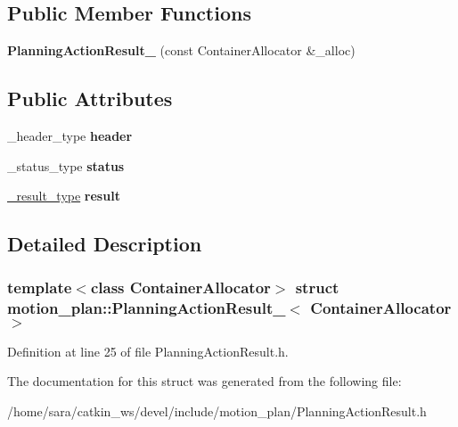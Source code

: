 \subsection*{Public Member Functions}
\begin{DoxyCompactItemize}
\item 
\mbox{\label{structmotion__plan_1_1PlanningActionResult___a4e03e3c0029195103b4500dd6cfce420}} 
{\bfseries Planning\+Action\+Result\+\_\+} (const Container\+Allocator \&\+\_\+alloc)
\end{DoxyCompactItemize}
\subsection*{Public Attributes}
\begin{DoxyCompactItemize}
\item 
\mbox{\label{structmotion__plan_1_1PlanningActionResult___ad28395876223b080fb23e7bd5564e360}} 
\+\_\+header\+\_\+type {\bfseries header}
\item 
\mbox{\label{structmotion__plan_1_1PlanningActionResult___ae81b09d2c3aa1285b2af68546b6aab4e}} 
\+\_\+status\+\_\+type {\bfseries status}
\item 
\mbox{\label{structmotion__plan_1_1PlanningActionResult___a87ce7de58a3f8b22f94d422e415821bf}} 
\hyperlink{structmotion__plan_1_1PlanningResult__}{\+\_\+result\+\_\+type} {\bfseries result}
\end{DoxyCompactItemize}


\subsection{Detailed Description}
\subsubsection*{template$<$class Container\+Allocator$>$\newline
struct motion\+\_\+plan\+::\+Planning\+Action\+Result\+\_\+$<$ Container\+Allocator $>$}



Definition at line 25 of file Planning\+Action\+Result.\+h.



The documentation for this struct was generated from the following file\+:\begin{DoxyCompactItemize}
\item 
/home/sara/catkin\+\_\+ws/devel/include/motion\+\_\+plan/Planning\+Action\+Result.\+h\end{DoxyCompactItemize}

